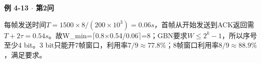{\color{ink}\bfseries 例 4-13 \(\cdot \) 第2问}\par\vspace{1bp}每帧发送时间\(T=\allowbreak{}1500\times 8/\allowbreak{}(200\times 10^{3})=\allowbreak{}0.06 s\)，首帧从开始发送到ACK返回需\(T+\allowbreak{}2\tau =\allowbreak{}0.54 s\)。故W\_min=\allowbreak{}\(\lceil \)0.8\(\times \)0.54/\allowbreak{}0.06\(\rceil \)=\allowbreak{}8；GBN要求\(W\le 2^{k}-1\)，所以序号至少4 bit。3 bit只能开7帧窗口，利用率\(7/\allowbreak{}9\approx 77.8\%\)；8帧窗口利用率\(8/\allowbreak{}9\approx 88.9\%\)，满足要求。
